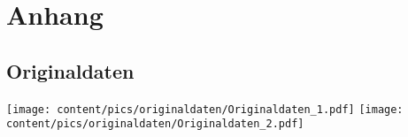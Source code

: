 \section{Anhang}
\label{sec:Anhang}
\subsection{Originaldaten}
\centering
\texttt{[image: content/pics/originaldaten/Originaldaten\_1.pdf]}
\newpage
\centering
\texttt{[image: content/pics/originaldaten/Originaldaten\_2.pdf]}